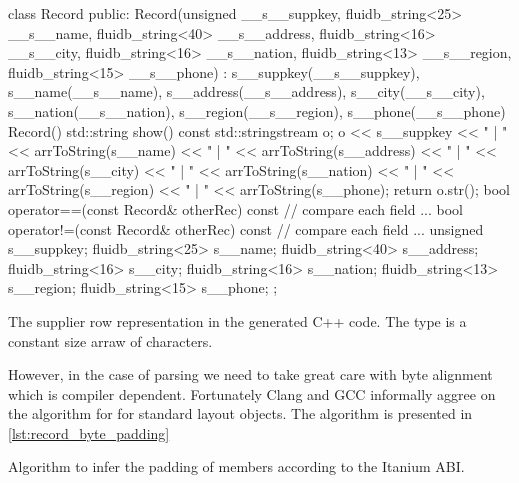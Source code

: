 \begin{code}
\begin{cppcode}
class Record {
public:
  Record(unsigned __s__suppkey, fluidb_string<25> __s__name,
         fluidb_string<40> __s__address, fluidb_string<16> __s__city,
         fluidb_string<16> __s__nation, fluidb_string<13> __s__region,
         fluidb_string<15> __s__phone)
    : s__suppkey(__s__suppkey),
      s__name(__s__name),
      s__address(__s__address),
      s__city(__s__city),
      s__nation(__s__nation),
      s__region(__s__region),
      s__phone(__s__phone) {}
  Record() {}
  std::string show() const {
    std::stringstream o;
    o << s__suppkey << " | " << arrToString(s__name) << " | "
      << arrToString(s__address) << " | " << arrToString(s__city) << " | "
      << arrToString(s__nation) << " | " << arrToString(s__region) << " | "
      << arrToString(s__phone);
    return o.str();
  }
  bool operator==(const Record& otherRec) const {
    // compare each field ...
  }
  bool operator!=(const Record& otherRec) const {
    // compare each field ...
  }
  unsigned s__suppkey;
  fluidb_string<25> s__name;
  fluidb_string<40> s__address;
  fluidb_string<16> s__city;
  fluidb_string<16> s__nation;
  fluidb_string<13> s__region;
  fluidb_string<15> s__phone;
};
\end{cppcode}
  \caption{\label{lst:recodr_class}The supplier row representation in
    the generated C++ code. The  type is a
    constant size arraw of characters.}
\end{code}

However, in the case of parsing we need to take great care with byte
alignment which is compiler dependent. Fortunately Clang and GCC
informally aggree on the algorithm for  for
standard layout objects. The algorithm is presented in
\ref{lst:record_byte_padding}

\begin{code}
  \caption{\label{lst:record_byte_padding}Algorithm to infer the
    padding of members according to the Itanium ABI.}
\end{code}


